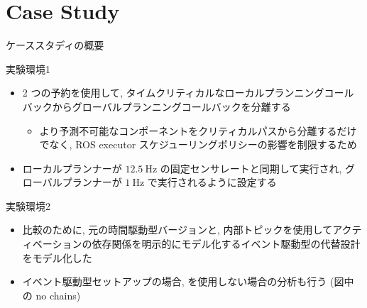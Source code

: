 
\section{Case Study}
\label{sec: case study}

\begin{frame}{ケーススタディの概要}
\end{frame}

\begin{frame}{実験環境1}
    \begin{itemize}
        \item 2 つの予約を使用して, タイムクリティカルなローカルプランニングコールバックからグローバルプランニングコールバックを分離する
              \begin{itemize}
                  \item より予測不可能なコンポーネントをクリティカルパスから分離するだけでなく, ROS executor スケジューリングポリシーの影響を制限するため
              \end{itemize}
        \item ローカルプランナーが $12.5 \mathrm{~Hz}$ の固定センサレートと同期して実行され, グローバルプランナーが $1 \mathrm{~Hz}$ で実行されるように設定する
    \end{itemize}
\end{frame}

\begin{frame}{実験環境2}
    \begin{itemize}
        \item 比較のために, 元の時間駆動型バージョンと, 内部トピックを使用してアクティベーションの依存関係を明示的にモデル化するイベント駆動型の代替設計をモデル化した
        \item イベント駆動型セットアップの場合,  を使用しない場合の分析も行う (図中の no chains)
    \end{itemize}
\end{frame}

